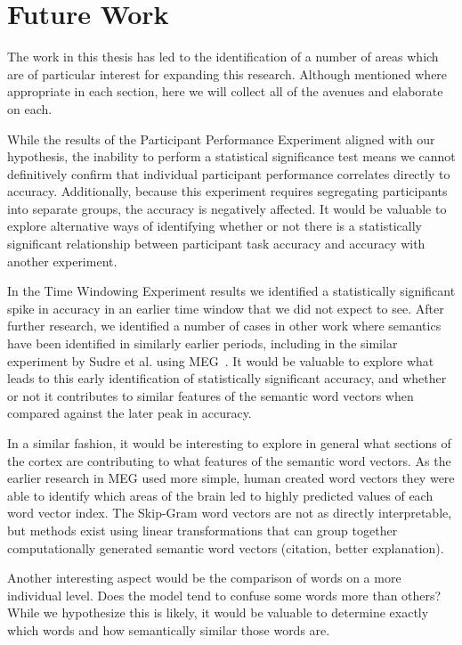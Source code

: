 \section{Future Work}

The work in this thesis has led to the identification of a number of areas 
which are of particular interest for expanding this research. Although 
mentioned where appropriate in each section, here we will collect all of the 
avenues and elaborate on each.

While the results of the Participant Performance Experiment aligned with our 
hypothesis, the inability to perform a statistical significance test means we 
cannot definitively confirm that individual participant performance correlates 
directly to \tvt accuracy. Additionally, because this experiment requires 
segregating participants into separate groups, the \tvt accuracy is negatively 
affected. It would be valuable to explore alternative ways of identifying 
whether or not there is a statistically significant relationship between 
participant task accuracy and \tvt accuracy with another experiment.

In the Time Windowing Experiment results we identified a statistically 
significant spike in \tvt accuracy in an earlier time window that we did not 
expect to see. After further research, we identified a number of cases in other 
work where semantics have been identified in similarly earlier periods, 
including in the similar experiment by Sudre et al. using MEG~\cite{Sudre2012}.
It would be valuable to explore what leads to this early identification of 
statistically significant accuracy, and whether or not it contributes to 
similar features of the semantic word vectors when compared against the later 
peak in accuracy.

In a similar fashion, it would be interesting to explore in general what 
sections of the cortex are contributing to what features of the semantic word 
vectors. As the earlier research in MEG used more simple, human created word 
vectors they were able to identify which areas of the brain led to highly 
predicted values of each word vector index. The Skip-Gram word vectors are not 
as directly interpretable, but methods exist using linear transformations that 
can group together computationally generated semantic word vectors (citation, 
better explanation).

Another interesting aspect would be the comparison of words on a more 
individual level. Does the model tend to confuse some words more than others?  
While we hypothesize this is likely, it would be valuable to determine exactly 
which words and how semantically similar those words are.

